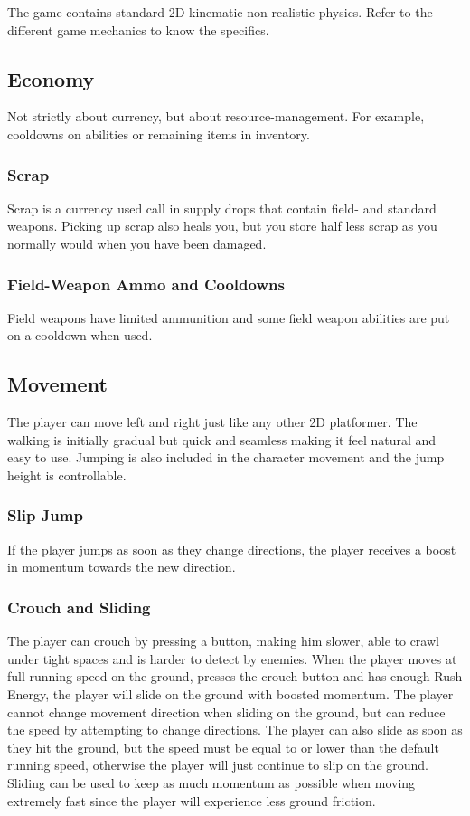 \documentclass[12pt]{article}
\begin{document}
The game contains standard 2D kinematic non-realistic physics. Refer to the different game mechanics to know the specifics.

\subsection{Economy}

Not strictly about currency, but about resource-management. For example, cooldowns on abilities or remaining items in inventory. 

\subsubsection{Scrap}

Scrap is a currency used call in supply drops that contain field- and standard weapons. Picking up scrap also heals you, but you store half  less scrap as you normally would when you have been damaged. 

\subsubsection{Field-Weapon Ammo and Cooldowns}

Field weapons have limited ammunition and some field weapon abilities are put on a cooldown when used. 

\subsection{Movement}

The player can move left and right just like any other 2D platformer. The walking is initially gradual but quick and seamless making it feel natural and easy to use. Jumping is also included in the character movement and the jump height is controllable.

\subsubsection{Slip Jump}

If the player jumps as soon as they change directions, the player receives a boost in momentum towards the new direction.

\subsubsection{Crouch and Sliding}

The player can crouch by pressing a button, making him slower, able to crawl under tight spaces and is harder to detect by enemies. When the player moves at full running speed on the ground, presses the crouch button and has enough Rush Energy, the player will slide on the ground with boosted momentum. The player cannot change movement direction when sliding on the ground, but can reduce the speed by attempting to change directions. The player can also slide as soon as they hit the ground, but the speed must be equal to or lower than the default running speed, otherwise the player will just continue to slip on the ground. Sliding can be used to keep as much momentum as possible when moving extremely fast since the player will experience less ground friction. 
\end{document}
